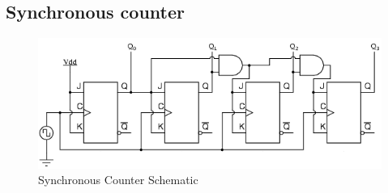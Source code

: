 \documentclass[a4paper]{article}
\begin{document}
    \subsection{Synchronous counter}
        
        \begin{figure}[H]
            \centering
            \includegraphics[width=\textwidth]{images/synchronouscounter_schematic}
            \caption{Synchronous Counter Schematic}
        \end{figure}


\null
\vfill


\end{document}
